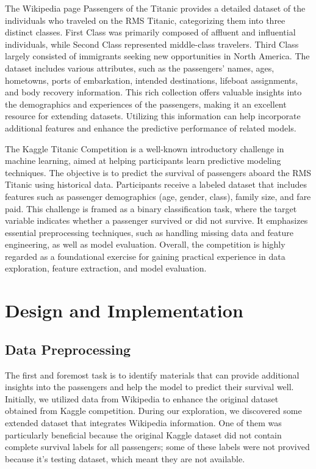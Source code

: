 \documentclass[conference]{IEEEtran}
\begin{document}
The Wikipedia page Passengers\cite{wiki:Passengers_of_the_Titanic} of the Titanic provides a detailed dataset of the individuals who traveled on the RMS Titanic, categorizing them into three distinct classes. First Class was primarily composed of affluent and influential individuals, while Second Class represented middle-class travelers. Third Class largely consisted of immigrants seeking new opportunities in North America\cite{wiki:Passengers_of_the_Titanic}.
The dataset includes various attributes, such as the passengers' names, ages, hometowns, ports of embarkation, intended destinations, lifeboat assignments, and body recovery information. This rich collection offers valuable insights into the demographics and experiences of the passengers, making it an excellent resource for extending datasets. Utilizing this information can help incorporate additional features and enhance the predictive performance of related models.

The Kaggle Titanic Competition\cite{kaggleTitanicMachine} is a well-known introductory challenge in machine learning, aimed at helping participants learn predictive modeling techniques. The objective is to predict the survival of passengers aboard the RMS Titanic using historical data. Participants receive a labeled dataset that includes features such as passenger demographics (age, gender, class), family size, and fare paid.
This challenge is framed as a binary classification task, where the target variable indicates whether a passenger survived or did not survive. It emphasizes essential preprocessing techniques, such as handling missing data and feature engineering, as well as model evaluation.
Overall, the competition is highly regarded as a foundational exercise for gaining practical experience in data exploration, feature extraction, and model evaluation\cite{kaggleTitanicMachine}.

\section{Design and Implementation}

\subsection{Data Preprocessing}
The first and foremost task is to identify materials that can provide additional insights into the passengers and help the model to predict their survival well. Initially, we utilized data from Wikipedia to enhance the original dataset obtained from Kaggle competition. During our exploration, we discovered some extended dataset that integrates Wikipedia information. One of them was particularly beneficial because the original Kaggle dataset did not contain complete survival labels for all passengers; some of these labels were not provived because it's testing dataset, which meant they are not available.
\end{document}
